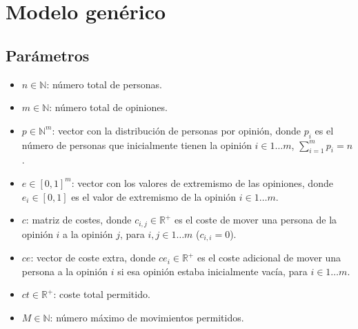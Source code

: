 




\maketitle


\tableofcontents

\clearpage



\section{Modelo genérico}

\subsection{Parámetros}

\begin{itemize}
	\item $n \in \mathbb{ N }$: número total de personas.

	\item $m \in \mathbb{ N }$: número total de opiniones.

	\item $p \in \mathbb{ N }^m$: vector con la distribución de personas por opinión, donde $p_i$ es el número de personas que inicialmente tienen la opinión $i \in 1\dots m$, $\sum_{ i = 1 }^m p_i = n$.

	\item $e \in [0,1]^m$: vector con los valores de extremismo de las opiniones, donde $e_i \in [0,1]$ es el valor de extremismo de la opinión $i \in 1 \dots m$.

	\item $c$: matriz de costes, donde $c_{ i,j } \in \mathbb{ R }^+$ es el coste de mover una persona de la opinión $i$ a la opinión $j$, para $i,j \in 1 \dots m$ ($c_{ i,i } = 0$).

	\item $ce$: vector de coste extra, donde $ce_i \in \mathbb{ R }^+$ es el coste adicional de mover una persona a la opinión $i$ si esa opinión estaba inicialmente vacía, para $i \in 1 \dots m$.

	\item $ct \in \mathbb{ R }^+$: coste total permitido.

	\item $M \in \mathbb{ N }$: número máximo de movimientos permitidos.
\end{itemize}

